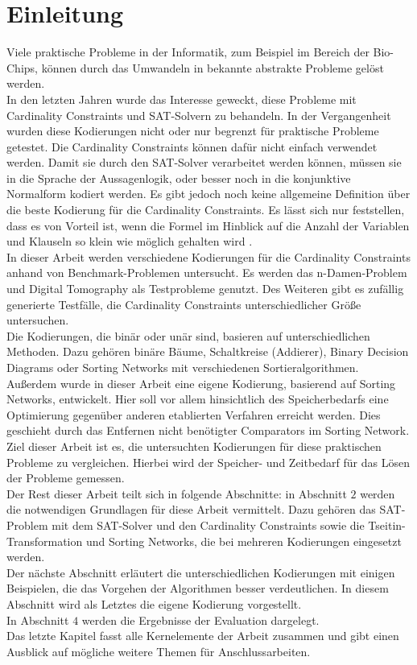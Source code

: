 \documentclass[a4,abstract=on]{scrartcl}
\newcommand*\stdsection{}
\let\stdsection\section
\renewcommand*\section{%
    \clearpage\ifodd\value{page}\else\mbox{}\clearpage\fi
    \stdsection}
\begin{document}
\section{Einleitung}
Viele praktische Probleme in der Informatik, zum Beispiel im Bereich der Bio-Chips, können durch das Umwandeln in bekannte abstrakte Probleme gelöst werden.\\
In den letzten Jahren wurde das Interesse geweckt, diese Probleme mit Cardinality Constraints und SAT-Solvern zu behandeln. In der Vergangenheit wurden diese Kodierungen nicht oder nur begrenzt für praktische Probleme getestet. Die Cardinality Constraints können dafür nicht einfach verwendet werden. Damit sie durch den SAT-Solver verarbeitet werden können, müssen sie in die Sprache der Aussagenlogik, oder besser noch in die konjunktive Normalform kodiert werden. Es gibt jedoch noch keine allgemeine Definition über die beste Kodierung für die Cardinality Constraints. Es lässt sich nur feststellen, dass es von Vorteil ist, wenn die Formel im Hinblick auf die Anzahl der Variablen und Klauseln so klein wie möglich gehalten wird \cite[][]{einleitung}.\\
In dieser Arbeit werden verschiedene Kodierungen für die Cardinality Constraints anhand von Benchmark-Problemen untersucht. Es werden das n-Damen-Problem und Digital Tomography als Testprobleme genutzt. Des Weiteren gibt es zufällig generierte Testfälle, die Cardinality Constraints unterschiedlicher Größe untersuchen. \\
Die Kodierungen, die binär oder unär sind, basieren auf unterschiedlichen Methoden. Dazu gehören binäre Bäume, Schaltkreise (Addierer), Binary Decision Diagrams oder Sorting Networks mit verschiedenen Sortieralgorithmen. \\
Außerdem wurde in dieser Arbeit eine eigene Kodierung, basierend auf Sorting Networks, entwickelt. Hier soll vor allem hinsichtlich des Speicherbedarfs eine Optimierung gegenüber anderen etablierten Verfahren erreicht werden. Dies geschieht durch das Entfernen nicht benötigter Comparators im Sorting Network. \\
Ziel dieser Arbeit ist es, die untersuchten Kodierungen für diese praktischen Probleme zu vergleichen. Hierbei wird der Speicher- und Zeitbedarf für das Lösen der Probleme gemessen. \\
\newline
Der Rest dieser Arbeit teilt sich in folgende Abschnitte: in Abschnitt $2$ werden die notwendigen Grundlagen für diese Arbeit vermittelt. Dazu gehören das SAT-Problem mit dem SAT-Solver und den Cardinality Constraints sowie die Tseitin-Transformation und Sorting Networks, die bei mehreren Kodierungen eingesetzt werden.\\
Der nächste Abschnitt erläutert die unterschiedlichen Kodierungen mit einigen Beispielen, die das Vorgehen der Algorithmen besser verdeutlichen. In diesem Abschnitt wird als Letztes die eigene Kodierung vorgestellt.\\
In Abschnitt $4$ werden die Ergebnisse der Evaluation dargelegt. \\
Das letzte Kapitel fasst alle Kernelemente der Arbeit zusammen und gibt einen Ausblick auf mögliche weitere Themen für Anschlussarbeiten.
\end{document}
